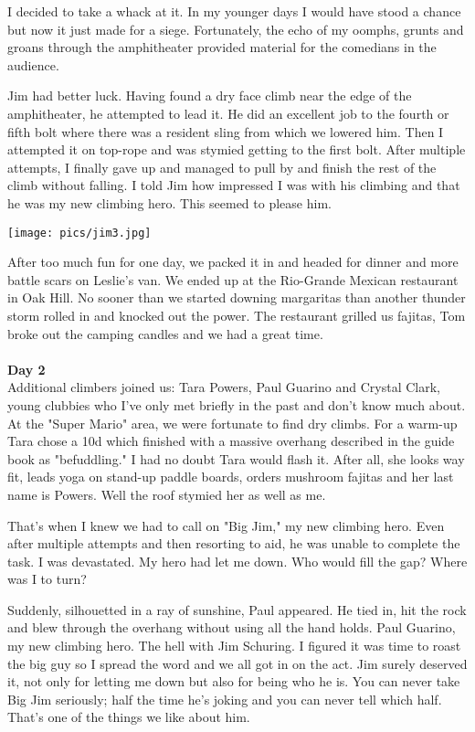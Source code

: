 \documentclass[10pt,a4paper]{article}
\newenvironment{Figure}
  {\par\medskip\noindent\minipage{\linewidth}}
  {\endminipage\par\medskip}
\begin{document}
\begin{multicols}{2}
I decided to take a whack at it.  In my younger days I would have stood a chance but now it just made for a siege.  Fortunately, the echo of my oomphs, grunts and groans through the amphitheater provided material for the comedians in the audience.

Jim had better luck. Having found a dry face climb near the edge of the amphitheater, he attempted to lead it.  He did an excellent job to the fourth or fifth bolt where there was a resident sling from which we lowered him.  Then I attempted it on top-rope and was stymied getting to the first bolt.  After multiple attempts, I finally gave up and managed to pull by and finish the rest of the climb without falling.  I told Jim how impressed I was with his climbing and that he was my new climbing hero.  This seemed to please him.

\begin{Figure}
 \centering
 \texttt{[image: pics/jim3.jpg]}
\end{Figure}



After too much fun for one day, we packed it in and headed for dinner and more battle scars on Leslie's van.  We ended up at the Rio-Grande Mexican restaurant in Oak Hill.  No sooner than we started downing margaritas than another thunder storm rolled in and knocked out the power.  The restaurant grilled us fajitas, Tom broke out the camping candles and we had a great time.
\\
\\
\textbf{Day 2}\\
Additional climbers joined us:  Tara Powers, Paul Guarino and Crystal Clark, young clubbies who I've only met briefly in the past and don't know much about.  At the "Super Mario" area, we were fortunate to find dry climbs.  For a warm-up Tara chose a 10d which finished with a massive overhang described in the guide book as "befuddling."  I had no doubt Tara would flash it.  After all, she looks way fit, leads yoga on stand-up paddle boards, orders mushroom fajitas and her last name is Powers.  Well the roof stymied her as well as me.

That's when I knew we had to call on "Big Jim," my new climbing hero.  Even after multiple attempts and then resorting to aid, he was unable to complete the task.  I was devastated.  My hero had let me down.  Who would fill the gap?  Where was I to turn?  

Suddenly, silhouetted in a ray of sunshine, Paul appeared.  He tied in, hit the rock and blew through the overhang without using all the hand holds.  Paul Guarino, my new climbing hero.  The hell with Jim Schuring.  I figured it was time to roast the big guy so I spread the word and we all got in on the act.  Jim surely deserved it, not only for letting me down but also for being who he is.  You can never take Big Jim seriously; half the time he's joking and you can never tell which half.  That's one of the things we like about him. 


\end{multicols}
\end{document}
